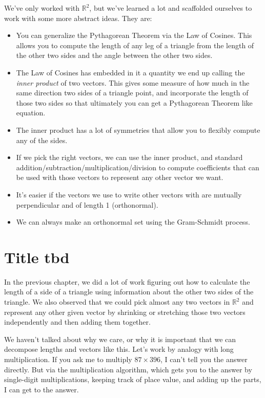 \documentclass[
]{book}
\providecommand{\tightlist}{%
  \setlength{\itemsep}{0pt}\setlength{\parskip}{0pt}}
\begin{document}
We've only worked with \(\mathbb{R}^2\), but we've learned a lot and scaffolded ourselves to work with some more abstract ideas. They are:

\begin{itemize}
\tightlist
\item
  You can generalize the Pythagorean Theorem via the Law of Cosines. This allows you to compute the length of any leg of a triangle from the length of the other two sides and the angle between the other two sides.
\item
  The Law of Cosines has embedded in it a quantity we end up calling the \emph{inner product} of two vectors. This gives some measure of how much in the same direction two sides of a triangle point, and incorporate the length of those two sides so that ultimately you can get a Pythagorean Theorem like equation.
\item
  The inner product has a lot of symmetries that allow you to flexibly compute any of the sides.
\item
  If we pick the right vectors, we can use the inner product, and standard addition/subtraction/multiplication/division to compute coefficients that can be used with those vectors to represent any other vector we want.
\item
  It's easier if the vectors we use to write other vectors with are mutually perpendicular and of length 1 (orthonormal).
\item
  We can always make an orthonormal set using the Gram-Schmidt process.
\end{itemize}

\hypertarget{title-tbd}{%
\chapter{Title tbd}\label{title-tbd}}

In the previous chapter, we did a lot of work figuring out how to calculate the length of a side of a triangle using information about the other two sides of the triangle. We also observed that we could pick almost any two vectors in \(\mathbb{R}^2\) and represent any other given vector by shrinking or stretching those two vectors independently and then adding them together.

We haven't talked about why we care, or why it is important that we can decompose lengths and vectors like this. Let's work by analogy with long multiplication. If you ask me to multiply \(87 \times 396\), I can't tell you the answer directly. But via the multiplication algorithm, which gets you to the answer by single-digit multiplications, keeping track of place value, and adding up the parts, I can get to the answer.
\end{document}
